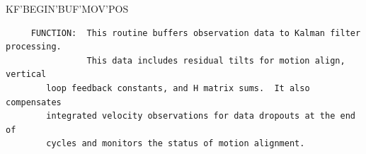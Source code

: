 \begin{frame}
KF'BEGIN'BUF'MOV'POS
\begin{verbatim}
     FUNCTION:  This routine buffers observation data to Kalman filter processing.  
                This data includes residual tilts for motion align, vertical 
		loop feedback constants, and H matrix sums.  It also compensates
		integrated velocity observations for data dropouts at the end of
		cycles and monitors the status of motion alignment.
								   
\end{verbatim}
\end{frame}

